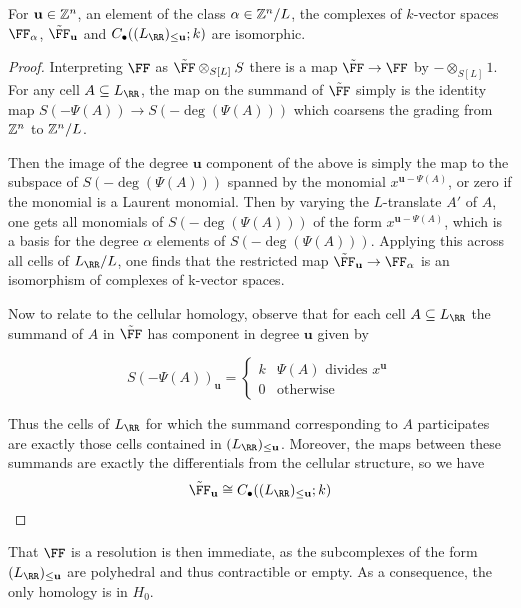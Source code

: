 \documentclass{amsart}
\begin{document}
\begin{prop}
  \label{prop:hhlStrands}
  For $\mathbf{u}\in \mathbb Z^n$, an element of the class $\alpha\in \mathbb Z^n/L$, the complexes of $k$-vector spaces $\FF_{\alpha}$, $\tilde \FF_{\mathbf{u}}$ and $C_\bullet((L_{\RR})_{\leq \mathbf{u}};k)$ are isomorphic.
\end{prop}
\begin{proof}
 Interpreting $\FF$ as $\tilde \FF \otimes_{S[L]}S$ there is a map $\tilde \FF \rightarrow \FF$ by $-\otimes_{S[L]}1$. For any cell $A\subseteq L_{\RR}$, the map on the summand of $\tilde \FF$ simply is the identity map $S(-\Psi(A))\rightarrow S(-\deg(\Psi(A)))$ which coarsens the grading from $\mathbb Z^n$ to $\mathbb Z^n/L$.

 Then the image of the degree $\mathbf{u}$ component of the above is simply the map to the subspace of $S(-\deg(\Psi(A)))$ spanned by the monomial $x^{\mathbf{u}-\Psi(A)}$, or zero if the monomial is a Laurent monomial.
  Then by varying the $L$-translate $A'$ of $A$, one gets all monomials of $S(-\deg(\Psi(A)))$ of the form $x^{\mathbf{u}-\Psi(A)}$, which is a basis for the degree $\alpha$ elements of $S(-\deg(\Psi(A)))$. Applying this across all cells of $L_{\RR}/L$, one finds that the restricted map $\tilde \FF_{\mathbf{u}}\rightarrow \FF_{\alpha}$ is an isomorphism of complexes of k-vector spaces.
  
  Now to relate to the cellular homology, observe that for each cell $A\subseteq L_{\RR}$ the summand of $A$ in $\tilde \FF$ has component in degree $\mathbf{u}$ given by

  \[S(-\Psi(A))_{\mathbf{u}} =
  \begin{cases}
    k & \Psi(A)\text{ divides } x^{\mathbf{u}}\\
    0 & \text{otherwise}
  \end{cases}\]

  Thus the cells of $L_{\RR}$ for which the summand corresponding to $A$ participates are exactly those cells contained in $(L_{\RR})_{\leq \mathbf{u}}$. Moreover, the maps between these summands are exactly the differentials from the cellular structure, so we have
  \[\tilde \FF_{\mathbf{u}} \cong C_\bullet((L_{\RR})_{\leq \mathbf{u}};k)\]
\end{proof}

That $\FF$ is a resolution is then immediate, as the subcomplexes of the form $(L_{\RR})_{\leq \mathbf{u}}$ are polyhedral and thus contractible or empty. As a consequence, the only homology is in $H_0$.
\end{document}
